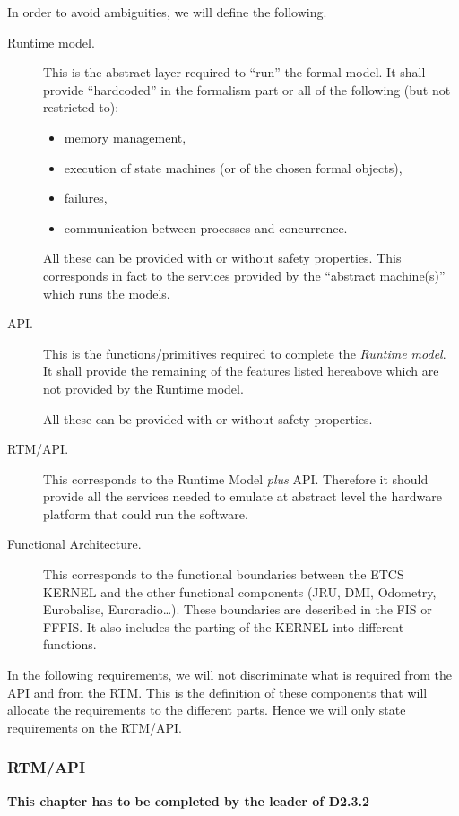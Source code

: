 \documentclass{template/openetcs_article}
\begin{document}
In order to avoid ambiguities, we will define the following.
\begin{description}
\item[Runtime model.] This is the abstract layer required to ``run'' the formal model. It shall provide
``hardcoded'' in the formalism part or all of the following (but not restricted to):
\begin{itemize}
\item memory management,
\item execution of state machines (or of the chosen formal objects), 
\item failures, 
\item communication between processes and concurrence. 
\end{itemize}
All these can be provided with or without safety properties. This corresponds in fact to the services 
provided by the ``abstract machine(s)'' which runs the models.
\item[API.]
 This is the functions/primitives required to complete the \emph{Runtime model}. It shall provide
the remaining of the features listed hereabove which are not provided by the Runtime model.

All these can be provided with or without safety properties.
\item[RTM/API.]
This corresponds to the Runtime Model \emph{plus} API. Therefore it should provide all the services
needed to emulate at abstract level the hardware platform that could run the software.
\item[Functional Architecture.] This corresponds to the functional boundaries between the ETCS KERNEL 
and the other functional components (JRU, DMI, Odometry, Eurobalise, Euroradio\dots). These boundaries
are described in the FIS or FFFIS. It also includes the parting of the KERNEL into different 
functions.
\end{description}

In the following requirements, we will not discriminate what is required from the API and from the 
RTM. This is the definition of these components that will allocate the requirements to the different 
parts. Hence we will only state requirements on the RTM/API.

\subsubsection{RTM/API}
\textbf{This chapter has to be completed by the leader of D2.3.2}

\end{document}
